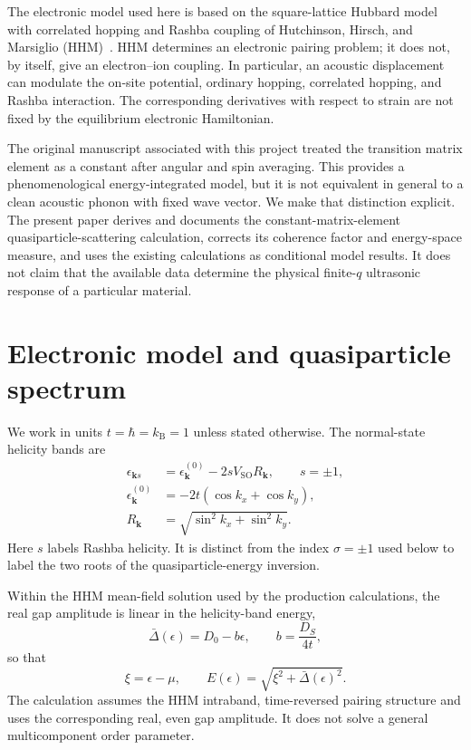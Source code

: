 \documentclass[aps,prb,reprint,superscriptaddress]{revtex4-2}
\newcommand{\kb}{k_{\mathrm B}}
\newcommand{\Dbar}{\bar\Delta}
\begin{document}
The electronic model used here is based on the square-lattice Hubbard model with correlated hopping and Rashba coupling of Hutchinson, Hirsch, and Marsiglio (HHM)~\cite{HHM}. HHM determines an electronic pairing problem; it does not, by itself, give an electron--ion coupling. In particular, an acoustic displacement can modulate the on-site potential, ordinary hopping, correlated hopping, and Rashba interaction. The corresponding derivatives with respect to strain are not fixed by the equilibrium electronic Hamiltonian.

The original manuscript associated with this project treated the transition matrix element as a constant after angular and spin averaging. This provides a phenomenological energy-integrated model, but it is not equivalent in general to a clean acoustic phonon with fixed wave vector. We make that distinction explicit. The present paper derives and documents the constant-matrix-element quasiparticle-scattering calculation, corrects its coherence factor and energy-space measure, and uses the existing calculations as conditional model results. It does not claim that the available data determine the physical finite-$q$ ultrasonic response of a particular material.

\section{Electronic model and quasiparticle spectrum}

We work in units $t=\hbar=\kb=1$ unless stated otherwise. The normal-state helicity bands are
\begin{align}
 \epsilon_{\bm k s} &= \epsilon_{\bm k}^{(0)}-2sV_{\mathrm{SO}}R_{\bm k},\qquad s=\pm1,\\
 \epsilon_{\bm k}^{(0)}&=-2t(\cos k_x+\cos k_y),\\
 R_{\bm k}&=\sqrt{\sin^2 k_x+\sin^2 k_y}.
\end{align}
Here $s$ labels Rashba helicity. It is distinct from the index $\sigma=\pm1$ used below to label the two roots of the quasiparticle-energy inversion.

Within the HHM mean-field solution used by the production calculations, the real gap amplitude is linear in the helicity-band energy,
\begin{equation}
 \Dbar(\epsilon)=D_0-b\epsilon,\qquad b=\frac{D_S}{4t},
\end{equation}
so that
\begin{equation}
 \xi=\epsilon-\mu,\qquad E(\epsilon)=\sqrt{\xi^2+\Dbar(\epsilon)^2}.
 \label{eq:qpenergy}
\end{equation}
The calculation assumes the HHM intraband, time-reversed pairing structure and uses the corresponding real, even gap amplitude. It does not solve a general multicomponent order parameter.
\end{document}
